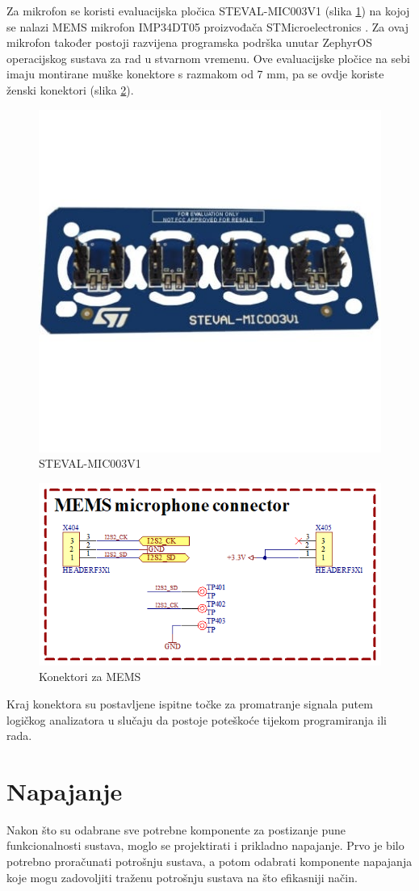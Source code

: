 Za mikrofon se koristi evaluacijska pločica STEVAL-MIC003V1 (slika \ref{slk:STEVAL}) na kojoj se nalazi MEMS mikrofon IMP34DT05 proizvođača STMicroelectronics \cite{stmicroelectronics:steval}. Za ovaj mikrofon također postoji razvijena programska podrška unutar ZephyrOS operacijskog sustava za rad u stvarnom vremenu. Ove evaluacijske pločice na sebi imaju montirane muške konektore s razmakom od 7 mm, pa se ovdje koriste ženski konektori (slika \ref{slk:MEMS}).
\begin{figure}[h!bt]
    \centering
    \includegraphics[width=6 cm]{Figures/STEVAL.jpg}
    \caption{STEVAL-MIC003V1 \cite{stmicroelectronics:steval}}
    \label{slk:STEVAL}
\end{figure}
\begin{figure}[h!bt]
    \centering
    \includegraphics[width=6 cm]{Figures/MEMS.png}
    \caption{Konektori za MEMS}
    \label{slk:MEMS}
\end{figure}
Kraj konektora su postavljene ispitne točke za promatranje signala putem logičkog analizatora u slučaju da postoje poteškoće tijekom programiranja ili rada.

\section{Napajanje}
Nakon što su odabrane sve potrebne komponente za postizanje pune funkcionalnosti sustava, moglo se projektirati i prikladno napajanje. Prvo je bilo potrebno proračunati potrošnju sustava, a potom odabrati komponente napajanja koje mogu zadovoljiti traženu potrošnju sustava na što efikasniji način.

